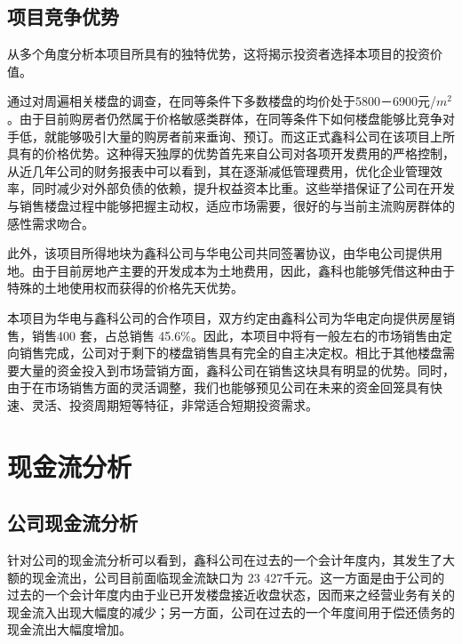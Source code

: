 \subsection{项目竞争优势}
从多个角度分析本项目所具有的独特优势，这将揭示投资者选择本项目的投资价值。
\begin{compactdesc}
\item[\bfseries \color{main}{价格优势}] 通过对周遍相关楼盘的调查，在同等条件下多数楼盘的均价处于5800－6900元/$m^2$。由于目前购房者仍然属于价格敏感类群体，在同等条件下如何楼盘能够比竞争对手低，就能够吸引大量的购房者前来垂询、预订。而这正式鑫科公司在该项目上所具有的价格优势。这种得天独厚的优势首先来自公司对各项开发费用的严格控制，从近几年公司的财务报表中可以看到，其在逐渐减低管理费用，优化企业管理效率，同时减少对外部负债的依赖，提升权益资本比重。这些举措保证了公司在开发与销售楼盘过程中能够把握主动权，适应市场需要，很好的与当前主流购房群体的感性需求吻合。

此外，该项目所得地块为鑫科公司与华电公司共同签署协议，由华电公司提供用地。由于目前房地产主要的开发成本为土地费用，因此，鑫科也能够凭借这种由于特殊的土地使用权而获得的价格先天优势。

\item[\bfseries \color{main}{销售优势}] 本项目为华电与鑫科公司的合作项目，双方约定由鑫科公司为华电定向提供房屋销售，销售400 套，占总销售 45.6\%。因此，本项目中将有一般左右的市场销售由定向销售完成，公司对于剩下的楼盘销售具有完全的自主决定权。相比于其他楼盘需要大量的资金投入到市场营销方面，鑫科公司在销售这块具有明显的优势。同时，由于在市场销售方面的灵活调整，我们也能够预见公司在未来的资金回笼具有快速、灵活、投资周期短等特征，非常适合短期投资需求。

\end{compactdesc}


\section{现金流分析}
\subsection{公司现金流分析}
针对公司的现金流分析可以看到，鑫科公司在过去的一个会计年度内，其发生了大额的现金流出，公司目前面临现金流缺口为 23 427千元。这一方面是由于公司的过去的一个会计年度内由于业已开发楼盘接近收盘状态，因而来之经营业务有关的现金流入出现大幅度的减少；另一方面，公司在过去的一个年度间用于偿还债务的现金流出大幅度增加。

